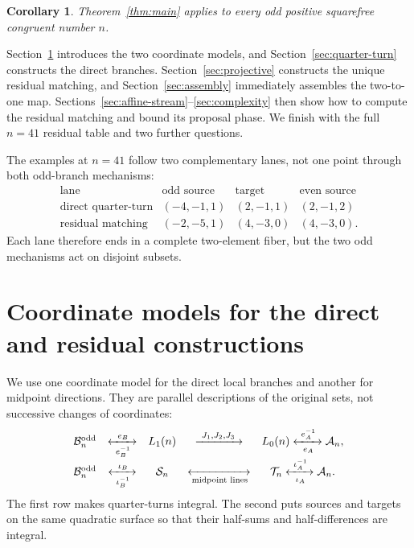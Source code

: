 \documentclass[11pt]{amsart}
\newtheorem{corollary}[theorem]{Corollary}
\theoremstyle{definition}
\theoremstyle{remark}
\newcommand{\An}{\mathcal A_n}
\newcommand{\Bodd}{\mathcal B_n^{\mathrm{odd}}}
\newcommand{\Sn}{\mathcal S_n}
\newcommand{\Tn}{\mathcal T_n}
\begin{document}
\begin{corollary}\label{cor:congruent}
Theorem~\ref{thm:main} applies to every odd positive squarefree congruent
number $n$.
\end{corollary}

Section~\ref{sec:coordinates} introduces the two coordinate models, and
Section~\ref{sec:quarter-turn} constructs the direct branches.
Section~\ref{sec:projective} constructs the unique residual matching, and
Section~\ref{sec:assembly} immediately assembles the two-to-one map.
Sections~\ref{sec:affine-stream}--\ref{sec:complexity} then show how to compute
the residual matching and bound its proposal phase.  We finish with the full
$n=41$ residual table and two further questions.

The examples at $n=41$ follow two complementary lanes, not one point through
both odd-branch mechanisms:
\[
\begin{array}{c|c|c|c}
\text{lane}&\text{odd source}&\text{target}&\text{even source}\\ \hline
\text{direct quarter-turn}&(-4,-1,1)&(2,-1,1)&(2,-1,2)\\
\text{residual matching}&(-2,-5,1)&(4,-3,0)&(4,-3,0).
\end{array}
\]
Each lane therefore ends in a complete two-element fiber, but the two odd
mechanisms act on disjoint subsets.

\section{Coordinate models for the direct and residual constructions}
\label{sec:coordinates}

We use one coordinate model for the direct local branches and another for
midpoint directions.  They are parallel descriptions of the original sets,
not successive changes of coordinates:
\[
\begin{array}{ccccc}
\Bodd&\xleftrightarrow[\ e_B^{-1}\ ]{\ e_B\ }&L_1(n)
&\xrightarrow{\ J_1,J_2,J_3\ }&L_0(n)
\xleftrightarrow[\ e_A\ ]{\ e_A^{-1}\ }\An,\\[5pt]
\Bodd&\xleftrightarrow[\ \iota_B^{-1}\ ]{\ \iota_B\ }&\Sn
&\xleftrightarrow[\text{midpoint lines}]{}&\Tn
\xleftrightarrow[\ \iota_A\ ]{\ \iota_A^{-1}\ }\An.
\end{array}
\]
The first row makes quarter-turns integral.  The second puts sources and
targets on the same quadratic surface so that their half-sums and
half-differences are integral.
\end{document}
